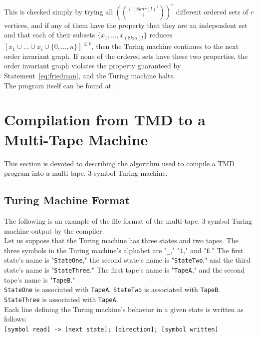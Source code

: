 \documentclass[11pt]{report}
\begin{document}
This is checked simply by trying all $({((8knr)!)^2 \choose i})^r$ different ordered sets of $r$ vertices, and if any of them have the property that they are an independent set and that each of their subsets $\{x_1, \dots, x_{(8kni)!}\}$ reduces $[x_1 \cup \dots \cup x_i \cup \{0,\dots,n\}]^{\le k}$, then the Turing machine continues to the next order invariant graph. If none of the ordered sets have these two properties, the order invariant graph violates the property guaranteed by Statement~\ref{eq:friedman}, and the Turing machine halts. \\

The program itself can be found at~\cite{github}.

\section{Compilation from TMD to a Multi-Tape Machine} \label{sec:turdtotm}

This section is devoted to describing the algorithm used to compile a TMD program into a multi-tape, 3-symbol Turing machine.

\subsection{Turing Machine Format}

The following is an example of the file format of the multi-tape, 3-symbol Turing machine output by the compiler. \\

Let us suppose that the Turing machine has three states and two tapes. The three symbols in the Turing machine's alphabet are "\texttt{\_}," "\texttt{1}," and "\texttt{E}." The first state's name is "\texttt{StateOne}," the second state's name is "\texttt{StateTwo}," and the third state's name is "\texttt{StateThree}." The first tape's name is "\texttt{TapeA}," and the second tape's name is "\texttt{TapeB}." \\

\texttt{StateOne} is associated with \texttt{TapeA}. \texttt{StateTwo} is associated with \texttt{TapeB}. \texttt{StateThree} is associated with \texttt{TapeA}. \\

Each line defining the Turing machine's behavior in a given state is written as follows: \\

\texttt{[symbol read] -> [next state]; [direction]; [symbol written]} \\
\end{document}
